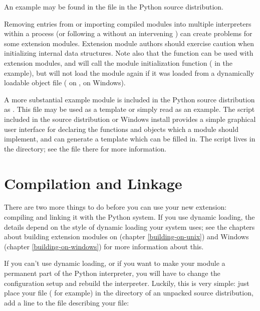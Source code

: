 \documentclass{manual}
\begin{document}
An example may be found in the file  in the
Python source distribution.

  Removing entries from  or importing
compiled modules into multiple interpreters within a process (or
following a  without an intervening
) can create problems for some extension modules.
Extension module authors should exercise caution when initializing
internal data structures.
Note also that the  function can be used with
extension modules, and will call the module initialization function
( in the example), but will not load the module
again if it was loaded from a dynamically loadable object file
( on \UNIX,  on Windows).

A more substantial example module is included in the Python source
distribution as .  This file may be used as a 
template or simply read as an example.  The 
script included in the source distribution or Windows install provides 
a simple graphical user interface for declaring the functions and
objects which a module should implement, and can generate a template
which can be filled in.  The script lives in the
 directory; see the  file there
for more information.


\section{Compilation and Linkage
         \label{compilation}}

There are two more things to do before you can use your new extension:
compiling and linking it with the Python system.  If you use dynamic
loading, the details depend on the style of dynamic loading your
system uses; see the chapters about building extension modules on
\UNIX{} (chapter \ref{building-on-unix}) and Windows (chapter
\ref{building-on-windows}) for more information about this.

If you can't use dynamic loading, or if you want to make your module a
permanent part of the Python interpreter, you will have to change the
configuration setup and rebuild the interpreter.  Luckily, this is
very simple: just place your file ( for example) in
the  directory of an unpacked source distribution, add
a line to the file  describing your file:
\end{document}
